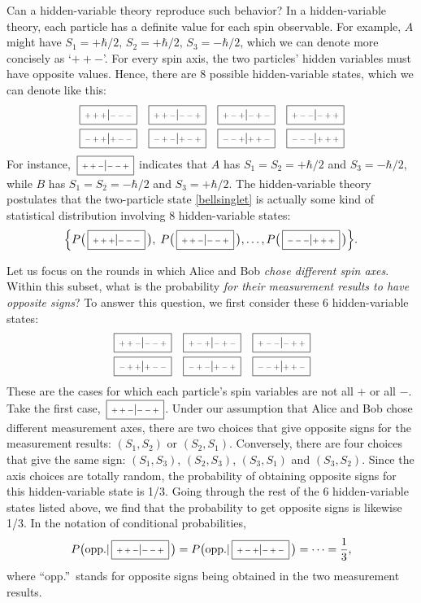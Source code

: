 \documentclass[pra,12pt]{revtex4-2}
\def\hvbox[#1]#2{\,\boxed{\scalebox{0.7}{$\,#1$}|\scalebox{0.7}{$#2\,$}}}
\begin{document}
Can a hidden-variable theory reproduce such behavior?  In a
hidden-variable theory, each particle has a definite value for each
spin observable.  For example, $A$ might have $S_1 = +\hbar/2, \, S_2
= +\hbar/2, \, S_3 = -\hbar/2$, which we can denote more concisely as
`$++-$'.  For every spin axis, the two particles' hidden variables
must have opposite values.  Hence, there are $8$ possible
hidden-variable states, which we can denote like this:
\begin{align*}
  \begin{aligned}
    \hvbox[+++]{---} \;\;\;
    \hvbox[++-]{--+} \;\;\;
    \hvbox[+-+]{-+-} \;\;\;
    \hvbox[+--]{-++}\\
    \hvbox[-++]{+--} \;\;\;
    \hvbox[-+-]{+-+} \;\;\;
    \hvbox[--+]{++-} \;\;\;
    \hvbox[---]{+++}
  \end{aligned}
\end{align*}
For instance, $\hvbox[++-]{--+}$ indicates that $A$ has $S_1 = S_2 =
+\hbar/2$ and $S_3 = -\hbar/2$, while $B$ has $S_1 = S_2 = -\hbar/2$
and $S_3 = +\hbar/2$.  The hidden-variable theory postulates that the
two-particle state \eqref{bellsinglet} is actually some kind of
statistical distribution involving 8 hidden-variable states:
\begin{equation*}
  \Big\{ P\big(\hvbox[+++]{---}\,\big), \;P\big(\hvbox[++-]{--+}\,\big),
  \dots, P\big(\hvbox[---]{+++}\,\big) \Big\}.
\end{equation*}

Let us focus on the rounds in which Alice and Bob \textit{chose
  different spin axes}.  Within this subset, what is the probability
\textit{for their measurement results to have opposite signs}?  To
answer this question, we first consider these 6 hidden-variable
states:
\begin{align*}
  \begin{aligned}
    \hvbox[++-]{--+} \;\;\;
    \hvbox[+-+]{-+-} \;\;\;
    \hvbox[+--]{-++}\\
    \hvbox[-++]{+--} \;\;\;
    \hvbox[-+-]{+-+} \;\;\;
    \hvbox[--+]{++-}
  \end{aligned}
\end{align*}
These are the cases for which each particle's spin variables are not
all $+$ or all $-$.  Take the first case, $\hvbox[++-]{--+}$.  Under
our assumption that Alice and Bob chose different measurement axes,
there are two choices that give opposite signs for the measurement
results: $(S_1,S_2)$ or $(S_2,S_1)$.  Conversely, there are four
choices that give the same sign: $(S_1,S_3)$, $(S_2,S_3)$, $(S_3,S_1)$
and $(S_3, S_2)$.  Since the axis choices are totally random, the
probability of obtaining opposite signs for this hidden-variable state
is 1/3.  Going through the rest of the 6 hidden-variable states listed
above, we find that the probability to get opposite signs is likewise
1/3.  In the notation of conditional probabilities,
\begin{equation}
  P\big(\textrm{opp.} | \hvbox[++-]{--+}\,\big) =
  P\big(\textrm{opp.} | \hvbox[+-+]{-+-}\,\big) = \cdots = \frac{1}{3},
  \label{bell1}
\end{equation}
where ``opp.''~stands for opposite signs being obtained in the two
measurement results.
\end{document}
